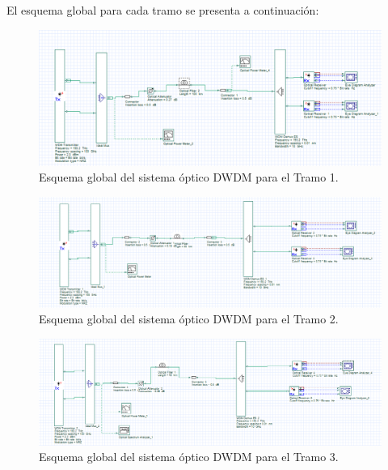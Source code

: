 \begin{itemize}
El esquema global para cada tramo se presenta a continuación:

\begin{figure}[H]
	\centering
	\includegraphics[width=0.9\linewidth]{img/ejemplos/Figure_4}
	\caption{Esquema global del sistema óptico DWDM para el Tramo 1.}
	\label{fig:optisystem_tramo1}
\end{figure}

\begin{figure}[H]
	\centering
	\includegraphics[width=0.9\linewidth]{img/ejemplos/Figure_5}
	\caption{Esquema global del sistema óptico DWDM para el Tramo 2.}
	\label{fig:optisystem_tramo2}
\end{figure}

\begin{figure}[H]
	\centering
	\includegraphics[width=0.9\linewidth]{img/ejemplos/Figure_6}
	\caption{Esquema global del sistema óptico DWDM para el Tramo 3.}
	\label{fig:optisystem_tramo3}
\end{figure}


\end{itemize}
